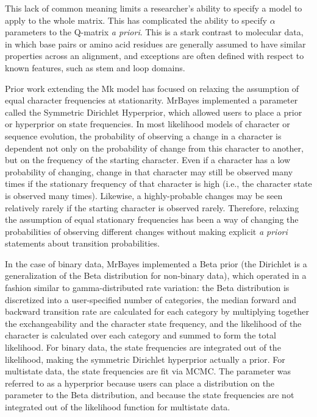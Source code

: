 \documentclass[]{article}
\begin{document}
	This lack of common meaning limits a researcher's ability to specify a model to apply to the whole matrix.
	This has complicated the ability to specify $\alpha$ parameters to the Q-matrix \textit{a priori}.
	This is a stark contrast to molecular data, in which base pairs or amino acid residues are generally assumed to have similar properties across an alignment, and exceptions are often defined with respect to known features, such as stem and loop domains. \par
Prior work extending the Mk model has focused on relaxing the assumption of equal character frequencies at stationarity.
MrBayes implemented a parameter called the Symmetric Dirichlet Hyperprior, which allowed users to place a prior or hyperprior on state frequencies. 
In most likelihood models of character or sequence evolution, the probability of observing a change in a character is dependent not only on the probability of change from this character to another, but on the frequency of the starting character.
Even if a character has a low probability of changing, change in that character may still be observed many times if the stationary frequency of that character is high (i.e., the character state is observed many times). 
Likewise, a highly-probable changes may be seen relatively rarely if the starting character is observed rarely. 
Therefore, relaxing the assumption of equal stationary frequencies has been a way of changing the probabilities of observing different changes without making explicit \textit{a priori} statements about transition probabilities. \par
In the case of binary data, MrBayes implemented a Beta prior (the Dirichlet is a generalization of the Beta distribution for non-binary data), which operated in a fashion similar to gamma-distributed rate variation: the Beta distribution is discretized into a user-specified number of categories, the median forward and backward transition rate are calculated for each category by multiplying together the exchangeability and the character state frequency, and the likelihood of the character is calculated over each category and summed to form the total likelihood. 
For binary data, the state frequencies are integrated out of the likelihood, making the symmetric Dirichlet hyperprior actually a prior.
For multistate data, the state frequencies are fit via MCMC.
The parameter was referred to as a hyperprior because users can place a distribution on the parameter to the Beta distribution, and because the state frequencies are not integrated out of the likelihood function for multistate data. 
\end{document}
